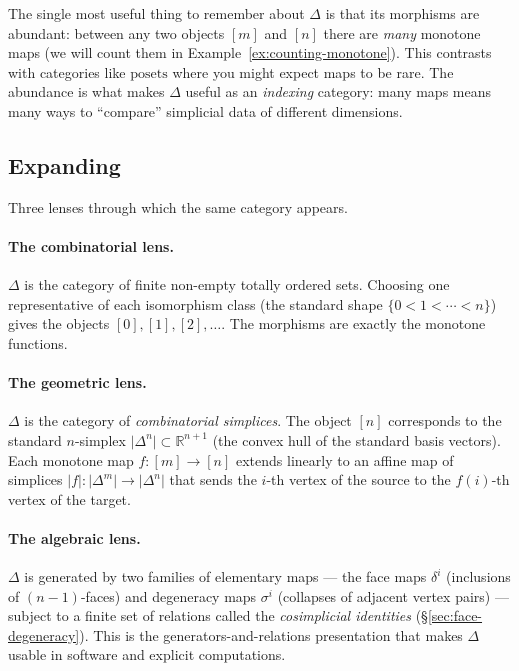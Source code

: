 \begin{readernote}
The single most useful thing to remember about $\Delta$ is that its
morphisms are abundant: between any two objects $[m]$ and $[n]$ there
are \emph{many} monotone maps (we will count them in
Example~\ref{ex:counting-monotone}). This contrasts with categories
like $\mathrm{posets}$ where you might expect maps to be rare. The
abundance is what makes $\Delta$ useful as an \emph{indexing} category:
many maps means many ways to ``compare'' simplicial data of different
dimensions.
\end{readernote}

\subsection{Expanding}

Three lenses through which the same category appears.

\paragraph{The combinatorial lens.}
$\Delta$ is the category of finite non-empty totally ordered sets.
Choosing one representative of each isomorphism class (the standard
shape $\{0 < 1 < \cdots < n\}$) gives the objects $[0], [1], [2],
\ldots$. The morphisms are exactly the monotone functions.

\paragraph{The geometric lens.}
$\Delta$ is the category of \emph{combinatorial simplices}. The object
$[n]$ corresponds to the standard $n$-simplex
$\lvert\Delta^n\rvert \subset \mathbb{R}^{n+1}$ (the convex hull of the
standard basis vectors). Each monotone map $f : [m] \to [n]$ extends
linearly to an affine map of simplices $\lvert f\rvert : \lvert\Delta^m\rvert
\to \lvert\Delta^n\rvert$ that sends the $i$-th vertex of the source to
the $f(i)$-th vertex of the target.

\paragraph{The algebraic lens.}
$\Delta$ is generated by two families of elementary maps — the face maps
$\delta^i$ (inclusions of $(n-1)$-faces) and degeneracy maps $\sigma^i$
(collapses of adjacent vertex pairs) — subject to a finite set of
relations called the \emph{cosimplicial identities}
(\S\ref{sec:face-degeneracy}). This is the generators-and-relations
presentation that makes $\Delta$ usable in software and explicit
computations.

